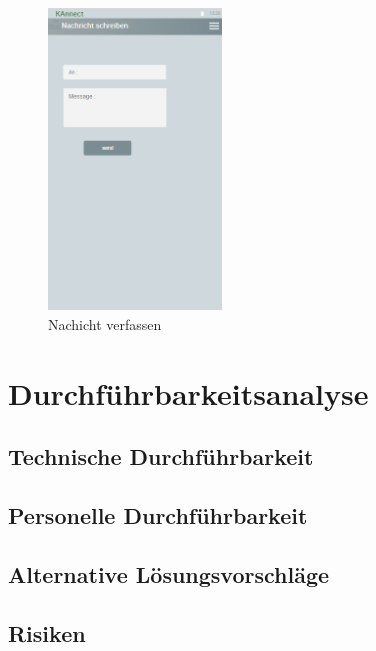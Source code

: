 \documentclass[parskip=full]{scrartcl}
\begin{document}
		\begin{figure}[h]
			\centering
			\includegraphics[height=8cm]{Message}
			\caption{Nachicht verfassen}
			\label{Nachricht}
		\end{figure}
		\newpage
		
		
	\section{Durchführbarkeitsanalyse}
	
	\subsection{Technische Durchführbarkeit}
	\subsection{Personelle Durchführbarkeit}
	\subsection{Alternative Lösungsvorschläge}
	\subsection{Risiken}
	
	
		
\printnoidxglossaries
	
\end{document}
